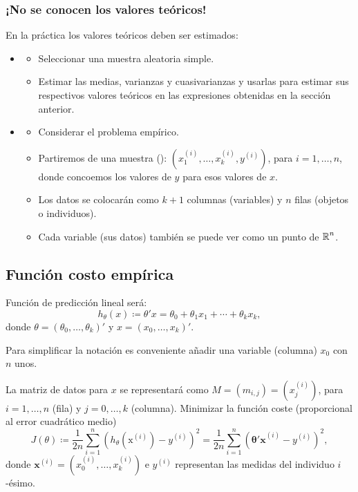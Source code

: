 \subsubsection*{¡No se conocen los valores teóricos!}
En la práctica los valores teóricos deben ser estimados:
\begin{itemize}[leftmargin=*]
	\item {}
	\begin{itemize}
		\item Seleccionar una muestra aleatoria simple.
		\item Estimar las medias, varianzas y cuasivarianzas y usarlas para estimar sus respectivos valores teóricos en las expresiones obtenidas en la sección anterior.
	\end{itemize}
	\item {}
	\begin{itemize}
		\item Considerar el problema empírico.
		\item Partiremos de una muestra (): $\left(x_1^{(i)},\dots,x_k^{(i)},y^{(i)}\right)$, para $i=1,\dots,n$, donde concoemos los valores de $y$ para esos valores de $x$.
		\item Los datos se colocarán como $k+1$ columnas (variables) y $n$ filas (objetos o individuos).
		\item Cada variable (sus datos) también se puede ver como un punto de $\operatorname{\mathbb{R}}^n$.
	\end{itemize}
\end{itemize}
\subsection{Función costo empírica}
Función de predicción lineal será: \[ h_\theta(x)\coloneq\theta'x=\theta_0+\theta_1x_1+\cdots+\theta_kx_k, \]donde $\theta=(\theta_0,\dots,\theta_k)'$ y $x=(x_0,\dots,x_k)'$.

Para simplificar la notación es conveniente añadir una variable (columna) $x_0$ con $n$ unos.

La matriz de datos para $x$ se representará como $M=(m_{i,j})=\left(x_j^{(i)}\right)$, para $i=1,\dots,n$ (fila) y $j=0,\dots,k$ (columna).
 Minimizar la función coste (proporcional al error cuadrático medio) \[ J(\theta)\coloneq\dfrac{1}{2n}\sum_{i=1}^{n}\left(h_\theta(\mathrm{x}^{(i)})-y^{(i)}\right)^2=\dfrac{1}{2n}\sum_{i=1}^{n}\left(\mathbf{\theta'x}^{(i)}-y^{(i)}\right)^2, \]donde $\mathbf{x}^{(i)}=\left(x_0^{(i)},\dots,x_k^{(i)}\right)$ e $y^{(i)}$ representan las medidas del individuo $i$-ésimo.

